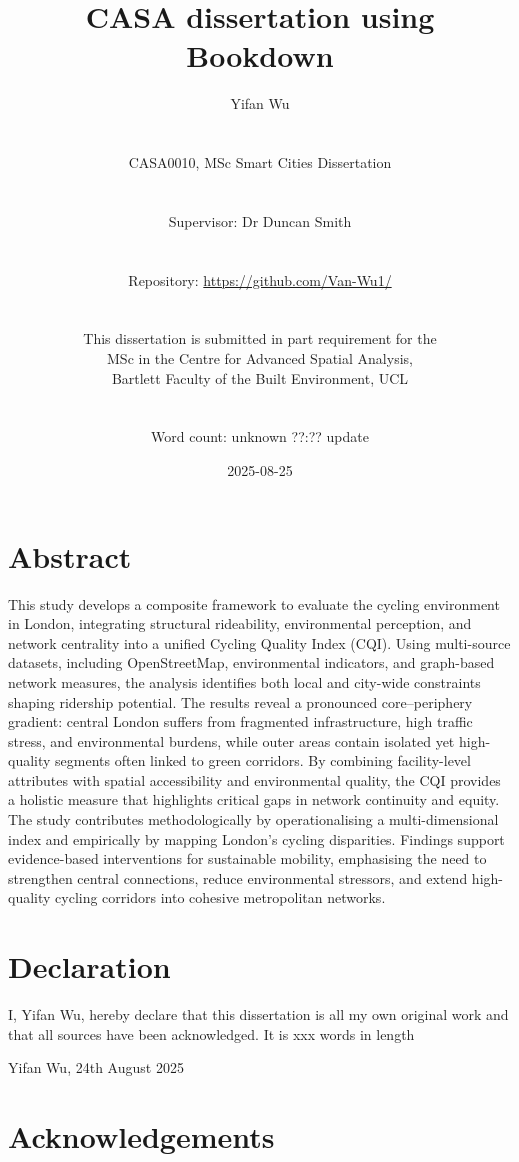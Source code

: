 \documentclass[
  12pt,
  oneside]{book}
\title{CASA dissertation using Bookdown}
\author{Yifan Wu\\
\strut \\
CASA0010, MSc Smart Cities Dissertation\\
\strut \\
Supervisor: Dr Duncan Smith\\
\strut \\
Repository: \url{https://github.com/Van-Wu1/}\\
\strut \\
This dissertation is submitted in part requirement for the\\
MSc in the Centre for Advanced Spatial Analysis,\\
Bartlett Faculty of the Built Environment, UCL\\
\strut \\
Word count: unknown ??:?? update}
\date{2025-08-25}
\begin{document}
\maketitle


\chapter*{Abstract}\label{abstract}

This study develops a composite framework to evaluate the cycling environment in London, integrating structural rideability, environmental perception, and network centrality into a unified Cycling Quality Index (CQI). Using multi-source datasets, including OpenStreetMap, environmental indicators, and graph-based network measures, the analysis identifies both local and city-wide constraints shaping ridership potential. The results reveal a pronounced core--periphery gradient: central London suffers from fragmented infrastructure, high traffic stress, and environmental burdens, while outer areas contain isolated yet high-quality segments often linked to green corridors. By combining facility-level attributes with spatial accessibility and environmental quality, the CQI provides a holistic measure that highlights critical gaps in network continuity and equity. The study contributes methodologically by operationalising a multi-dimensional index and empirically by mapping London's cycling disparities. Findings support evidence-based interventions for sustainable mobility, emphasising the need to strengthen central connections, reduce environmental stressors, and extend high-quality cycling corridors into cohesive metropolitan networks.


\chapter*{Declaration}\label{declaration}

I, Yifan Wu, hereby declare that this dissertation is all my own original work and that all sources have been acknowledged. It is xxx words in length

Yifan Wu, 24th August 2025

\chapter*{Acknowledgements}\label{acknowledgements}
\end{document}
